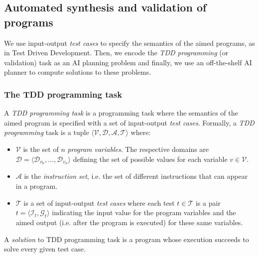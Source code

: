 \documentclass[10pt,a4paper]{paper}
\newcommand{\tup}[1]{{\langle #1 \rangle}}
\begin{document}
\subsection{Automated synthesis and validation of programs}
We use input-output {\em test cases} to specify the semantics of the aimed programs, as in Test Driven Development. Then, we encode the {\em TDD programming} (or validation) task as an AI planning problem and finally, we use an off-the-shelf AI planner to compute solutions to these problems.

\subsubsection{The TDD programming task}
A {\em TDD programming task} is a programming task where the semantics of the aimed program is specified with a set of input-output {\em test cases}. Formally, a {\em TDD programming} task is a tuple $\tup{{\mathcal V},{\mathcal D},{\mathcal A}, {\mathcal T}}$ where:
\begin{itemize}
\item ${\mathcal V}$ is the set of $n$ {\em program variables}. The respective domains are ${\mathcal D}=\tup{{\mathcal D}_{v_0}, \ldots, {\mathcal D}_{v_n}}$ defining the set of possible values for each variable $v\in {\mathcal V}$.
\item ${\mathcal A}$ is the {\em instruction set}, i.e. the set of different instructions that can appear in a program.
\item ${\mathcal T}$ is a set of input-output {\em test cases} where each test $t\in {\mathcal T}$ is a pair $t=\tup{{\mathcal I}_t,{\mathcal G}_t}$ indicating the input value for the program variables and the aimed output (i.e. after the program is executed) for these same variables.
\end{itemize}
A {\em solution} to TDD programming task is a program whose execution succeeds to solve every given test case.
\end{document}
